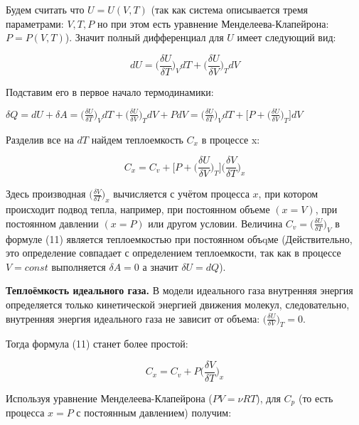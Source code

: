 \documentclass[10pt]{article}
\begin{document}
    Будем считать что $U = U(V,T)$ (так как система описывается тремя параметрами: $V,T,P$ но при этом есть уравнение Менделеева-Клапейрона: $P = P(V,T)$).
    Значит полный дифференциал для $U$ имеет следующий вид:

    \begin{equation}
        dU = \bigg(\frac{\delta U}{\delta T}\bigg)_V dT + \bigg(\frac{\delta U}{\delta V}\bigg)_T dV
    \end{equation}

    Подставим его в первое начало термодинамики:

    $  \delta Q = dU + \delta A =  \bigg(\frac{\delta U}{\delta T}\bigg)_V dT + \bigg(\frac{\delta U}{\delta V}\bigg)_T dV + PdV = \bigg(\frac{\delta U}{\delta T}\bigg)_V dT + \bigg[P + \bigg(\frac{\delta U}{\delta V}\bigg)_T \bigg] dV $

    Разделив все на $dT$ найдем теплоемкость $C_x$ в процессе x:

    \begin{equation}
        C_x = C_v + \bigg[P + \bigg(\frac{\delta U}{\delta V}\bigg)_T \bigg] \bigg(\frac{\delta V}{\delta T}\bigg)_x
    \end{equation}

    Здесь производная $\bigg(\frac{\delta V}{\delta T}\bigg)_x$ вычисляется с учётом процесса $x$, при котором происходит подвод тепла, например, при постоянном объеме $(x = V)$, при постоянном давлении $(x = P)$ или другом условии. Величина $C_v = \bigg(\frac{\delta U}{\delta T}\bigg)_V$ в формуле (11) является теплоемкостью при постоянном объqме (Действительно, это определение совпадает с определением теплоемкости, так как в процессе $V = const$ выполняется $\delta A = 0$ а значит $\delta U = dQ$).

    \textbf{Теплоёмкость идеального газа.}
    В модели идеального газа внутренняя энергия определяется только кинетической энергией движения молекул, следовательно, внутренняя энергия идеального газа не зависит от объема: $\bigg(\frac{\delta U}{\delta V}\bigg)_T = 0$.

    Тогда формула (11) станет более простой:

    \begin{equation}
        C_x = C_v + P \bigg(\frac{\delta V}{\delta T}\bigg)_x
    \end{equation}

    Используя уравнение Менделеева-Клапейрона ($PV = \nu RT$),
    для $C_p$ (то есть процесса $x = P$ с постоянным давлением) получим:
\end{document}
